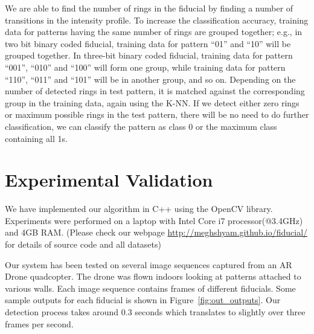 We are able to find the number of rings in the fiducial by finding
a number of transitions in the intensity profile. To increase the classification
accuracy, training data for patterns having the same number of rings are grouped
together; e.g., in two bit binary coded fiducial, training data for pattern ``01'' and ``10'' will be
grouped together. In three-bit binary coded fiducial, training data for pattern
``001'', ``010'' and ``100'' will form one group, while training data for
pattern ``110'', ``011'' and ``101'' will be in another group, and so on.
Depending on the number of detected rings in test pattern, it is matched
against the corresponding group in the training data, again using  the K-NN.
If we detect either zero rings or maximum possible
rings in the test pattern, there will be no need to do further classification, we
can classify the pattern as class 0 or the maximum class containing all 1s.

\section{Experimental Validation}

We have implemented our algorithm in C++ using the OpenCV library.
Experiments were performed on a laptop with Intel Core i7
processor(@3.4GHz) and 4GB RAM. (Please check our webpage
\url{http://meghshyam.github.io/fiducial/} for details of source code
and all datasets)

Our system has been tested on several image sequences captured from an
AR Drone quadcopter.  The drone was flown indoors looking at patterns
attached to various walls. Each image sequence contains frames of
different fiducials. Some sample outputs for each fiducial
is shown in Figure~\ref{fig:out_outputs}. Our detection process takes
around 0.3 seconds which translates to slightly over three frames per
second.


